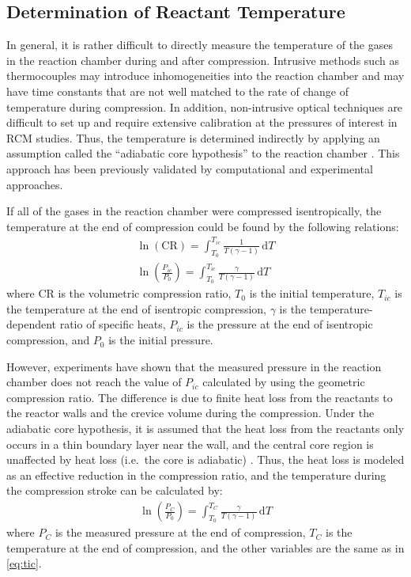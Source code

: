 \documentclass[../main.tex]{subfiles}
\begin{document}
\subsection{Determination of Reactant Temperature}
\label{sec:reac-temp}

In general, it is rather difficult to directly measure the temperature
of the gases in the reaction chamber during and after compression.
Intrusive methods such as thermocouples may introduce inhomogeneities into
the reaction chamber and may have time constants that are not well matched
to the rate of change of temperature during compression. In addition,
non-intrusive optical techniques are difficult to set up
and require extensive calibration at the pressures of interest in RCM
studies. Thus, the temperature is determined indirectly by applying an
assumption called the ``adiabatic core hypothesis'' to the reaction chamber
\cite{Mittal2007, Lee1998}. This approach has been previously validated by
computational \cite{Mittal2008b} and experimental \cite{Das2012a,Uddi2012}
approaches.

If all of the gases in the reaction chamber were compressed isentropically,
the temperature at the end of compression could be found by the
following relations:
%
\begin{subequations}
\label{eq:tic}
\begin{align}
\ln\left(\text{CR}\right) = \int_{T_0}^{T_{ic}} \! \frac{1}{T\left(\gamma-1\right)} \, \mathrm{d} T \\
\ln\left(\frac{P_{ic}}{P_0}\right) = \int_{T_0}^{T_{ic}} \! \frac{\gamma}{T\left(\gamma-1\right)} \, \mathrm{d} T
\end{align}
\end{subequations}
%
where CR is the volumetric compression ratio, $T_0$ is the initial temperature,
$T_{ic}$ is the temperature at the end of isentropic compression, $\gamma$ is the
temperature-dependent ratio of specific heats, $P_{ic}$ is the pressure at the
end of isentropic compression, and $P_0$ is the initial pressure.

However, experiments have shown that the measured pressure in the reaction chamber
does not reach the value of $P_{ic}$ calculated by using the geometric
compression ratio. The difference is due to finite heat loss from the
reactants to the reactor walls and the crevice volume during the
compression. Under the adiabatic core hypothesis, it is assumed that
the heat loss from the reactants only occurs in a thin boundary layer
near the wall, and the central core region is unaffected by heat loss
(i.e.\ the core is adiabatic) \cite{Desgroux1995}. Thus, the heat
loss is modeled as an effective reduction in the compression ratio, and
the temperature during the compression stroke can be calculated by:
%
\begin{align}
\ln\left(\frac{P_{C}}{P_0}\right) = \int_{T_0}^{T_{C}} \! \frac{\gamma}{T\left(\gamma-1\right)} \, \mathrm{d} T
\label{eq:tc}
\end{align}
%
where $P_C$ is the measured pressure at the end of compression, $T_C$
is the temperature at the end of compression, and the other variables
are the same as in \cref{eq:tic}.
\end{document}
